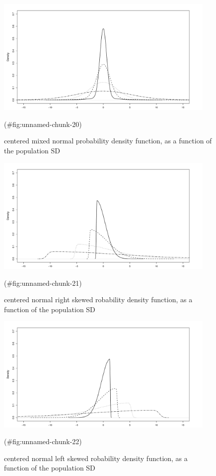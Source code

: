 \begin{appendix}
\begin{figure}
\includegraphics[width=400px]{W-test_files/figure-latex/unnamed-chunk-20-1} \caption{centered mixed normal probability density function, as a function of the population SD}(\#fig:unnamed-chunk-20)
\end{figure}

\begin{figure}
\includegraphics[width=400px]{W-test_files/figure-latex/unnamed-chunk-21-1} \caption{centered normal right skewed robability density function, as a function of the population SD}(\#fig:unnamed-chunk-21)
\end{figure}

\begin{figure}
\includegraphics[width=400px]{W-test_files/figure-latex/unnamed-chunk-22-1} \caption{centered normal left skewed robability density function, as a function of the population SD}(\#fig:unnamed-chunk-22)
\end{figure}


\end{appendix}
